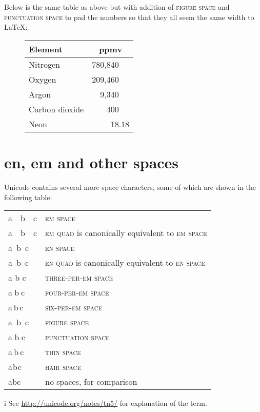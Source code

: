 \documentclass{article}
\DeclareRobustCommand{\expl}[1]{\textsf{#1}}
\newcommand{\enquad}{\textsc{en quad}}
\newcommand{\enspaceC}{\textsc{en space}}
\newcommand{\emquad}{\textsc{em quad}}
\newcommand{\emspaceC}{\textsc{em space}}
\newcommand{\threePerEm}{\textsc{three-per-em space}}
\newcommand{\fourPerEm}{\textsc{four-per-em space}}
\newcommand{\sixPerEm}{\textsc{six-per-em space}}
\newcommand{\figuresp}{\textsc{figure space}}
\newcommand{\punctsp}{\textsc{punctuation space}}
\newcommand{\thinsp}{\textsc{thin space}}
\newcommand{\hairsp}{\textsc{hair space}}
\begin{document}
\expl{Below is the same table as above but with addition of \figuresp{} and
  \punctsp{} to pad the numbers so that they all seem the same width to
  \LaTeX{}:}

\begin{figure}[H]
\centering
\begin{tabular}{l | c}
  Element & ppmv \tabularnewline
  \hline
  Nitrogen &      780,840   \tabularnewline
  Oxygen &        209,460   \tabularnewline
  Argon &           9,340   \tabularnewline
  Carbon dioxide &    400   \tabularnewline
  Neon &               18.18
\end{tabular}
\end{figure}

\pagebreak

\section{en, em and other spaces}

\expl{Unicode contains several more space characters, some of which are shown in
the following table:}

\begin{center}
\begin{threeparttable}
\begin{tabular}[c]{l | >{\raggedright}p{}}
  a b c & \expl{\emspaceC{}}\tabularnewline
  a b c & \expl{\emquad{} is canonically equivalent{\tnote{i} } to \emspaceC{}}\tabularnewline
  a b c & \expl{\enspaceC{}}\tabularnewline
  a b c & \expl{\enquad{} is canonically equivalent{\tnote{i} } to \enspaceC{}}\tabularnewline
  a b c & \expl{\threePerEm{}}\tabularnewline
  a b c & \expl{\fourPerEm{}}\tabularnewline
  a b c & \expl{\sixPerEm{}}\tabularnewline
  a b c & \expl{\figuresp{}}\tabularnewline
  a b c & \expl{\punctsp{}}\tabularnewline
  a b c & \expl{\thinsp{}}\tabularnewline
  a b c & \expl{\hairsp{}}\tabularnewline
  abc   & \expl{no spaces, for comparison}\tabularnewline
\end{tabular}
\begin{tablenotes}
\item[\expl{i}] \expl{\footnotesize See \url{http://unicode.org/notes/tn5/}
    for explanation of the term.}
\end{tablenotes}
\end{threeparttable}
\end{center}
\end{document}
